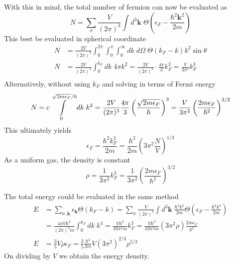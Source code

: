 \documentclass[../../../main.tex]{subfiles}
\begin{document}
With this in mind, the total number of fermion can now be evaluated as
\begin{equation*}
  N = \sum_{\sigma} \frac{V }{(2\pi)^3 } \int d^3\mathbf{k} \; \Theta \left( \epsilon_F - \frac{\hbar ^2 \mathbf{k}^2 }{2m} \right)
\end{equation*}
This best be evaluated in spherical coordinate
\begin{align*}
  N & =   \frac{2V }{(2\pi)^3 }     \int_{0}^{2\pi} \int_{0}^{ \pi} \int_{0}^{\infty}dk\;d\Omega \;\Theta \left( k_F-k \right)   k^2 \sin \theta        \\
  N & =  \frac{2 V}{(2\pi)^{3}} \int_{0}^{k_{F}}dk\;  4\pi k^{2} = \frac{2 V}{(2\pi)^{3}} \cdot \frac{4\pi}{3} k_{F}^{3} = \frac{V}{3\pi^{2}} k_{F}^{3} \\
\end{align*}
Alternatively, without using $k_F$ and solving in terms of Fermi energy
\begin{equation*}
  N =  c \int\displaylimits_{0}^{\sqrt{2m\epsilon_F}/\hbar }dk\;  k^{2} = \frac{2 V}{(2\pi)^{3}} \frac{4\pi}{3} \left( \frac{\sqrt{2m\epsilon_F} }{\hbar } \right) ^{3} =  \frac{V}{3\pi^{2}} \left( \frac{2m\epsilon_F }{\hbar^2 } \right)^{3/2}
\end{equation*}
This ultimately yields
\begin{equation*}
  \epsilon_F = \frac{\hbar ^2 k_F^2}{ 2m} = \frac{\hbar ^2 }{2m }\left( 3\pi^2 \frac{N }{V } \right)^{1/3}
\end{equation*}
As a uniform gas, the density is constant
\begin{equation*}
  \rho = \frac{1}{3\pi^{2}} k_{F}^{3} = \frac{1}{3\pi^{2}} \left( \frac{2m\epsilon_F }{\hbar ^2 } \right) ^{3/2}
\end{equation*}

The total energy could be evaluated in the same method
\begin{align*}
  E & =  \sum_{\sigma,\mathbf{k }}  \epsilon_{\mathbf{k}} \Theta \left(k_F-k\right)
  =\sum_{\sigma} \frac{V}{(2\pi)^3} \int d^3 \mathbf{k}\; \frac{\hbar^{2}k^{2}}{2m} \Theta \left( \epsilon_{F} - \frac{\hbar^{2}k^{2}}{2m} \right) \\
    & =  \frac{4\pi V \hbar ^2}{(2\pi)^{3}m} \int_{0}^{k_{F}}dk\;  k^{4}
  = \frac{V \hbar ^2}{10\pi^{2}m} k_{F}^{5}
  = \frac{V \hbar ^2}{10\pi^{2}m} \left( 3\pi^2 \rho\right) \frac{2m\epsilon_F }{\hbar ^2}                                                         \\
  E & = \frac{3 }{5 }V \rho \epsilon_F = \frac{3 }{5 }\frac{\hbar ^2 }{2m }V(3\pi^2  )^{2/3}\rho^{5/3}
\end{align*}
On dividing by $V$ we obtain the energy density.
\end{document}

